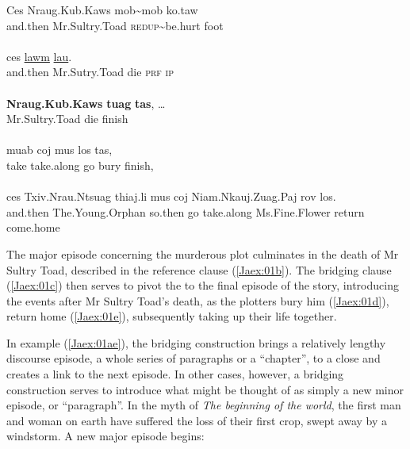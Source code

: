 \documentclass[output=paper]{LSP/langsci}
\begin{document}
\begin{exe}
\ex \label{Jaex:01ae}
\begin{xlist}
\ex \label{Jaex:01a}
\gll Ces Nraug.Kub.Kaws mob{\textasciitilde}mob ko.taw\\
and.then Mr.Sultry.Toad \textsc{redup}{\textasciitilde}be.hurt foot\\
\glt {}\\
\ex \label{Jaex:01b}
\gll ces \underline{} \underline{} \underline{lawm} \underline{lau}.\\
and.then Mr.Sutry.Toad die \textsc{prf} \textsc{ip}\\ 
\glt {}\\
\ex \label{Jaex:01c}
\gll \textbf{Nraug.Kub.Kaws} \textbf{tuag} \textbf{tas}, …\\		
Mr.Sultry.Toad die finish \\ 
\glt {}\\
\ex \label{Jaex:01d}
\gll muab coj mus los tas, \\		           
take take.along go bury finish,\\
\glt {}\\
\ex \label{Jaex:01e}
\gll ces Txiv.Nrau.Ntsuag thiaj.li mus coj Niam.Nkauj.Zuag.Paj rov los.\\     	      
and.then The.Young.Orphan so.then go take.along Ms.Fine.Flower return come.home\\
\glt {} \citep[][140]{johnson92}
\end{xlist}
\end{exe}

\noindent
The major episode concerning the murderous plot culminates in the death of Mr Sultry Toad, described in the reference clause (\ref{Jaex:01b}). The bridging clause (\ref{Jaex:01c}) then serves to pivot the  to the final episode of the story, introducing the events after Mr Sultry Toad’s death, as the plotters bury him (\ref{Jaex:01d}), return home (\ref{Jaex:01e}), subsequently taking up their life together. 
 
In example (\ref{Jaex:01ae}), the bridging construction brings a relatively lengthy discourse episode, a whole series of paragraphs or a ``chapter'', to a close and creates a link to the next episode. In other cases, however, a bridging construction serves to introduce what might be thought of as simply a new minor episode, or ``paragraph''. In the myth of \textit{The beginning of the world}, the first man and woman on earth have suffered the loss of their first crop, swept away by a windstorm. A new major episode begins:
\end{document}
